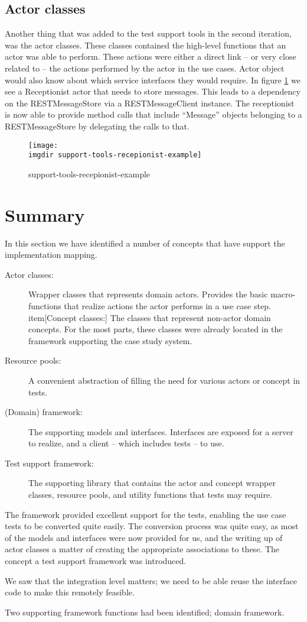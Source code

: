 \subsection{Actor classes}
Another thing that was added to the test support tools in the second iteration, was the actor classes. These classes contained the high-level functions that an actor was able to perform. These actions were either a direct link -- or very close related to -- the actions performed by the actor in the use cases. Actor object would also know about which service interfaces they would require. In figure \ref{fig:support-tools-recepionist-example} we see a Receptionist actor that needs to store messages. This leads to a dependency on the RESTMessageStore via a RESTMessageClient instance. The receptionist is now able to provide method calls that include ``Message'' objects belonging to a RESTMessageStore by delegating the calls to that.
\begin{figure}[!htbp]
 \centering
 \texttt{[image: \\imgdir support-tools-recepionist-example]}
 \caption{support-tools-recepionist-example}
 \label{fig:support-tools-recepionist-example}
\end{figure}

\section{Summary}
In this section we have identified a number of concepts that have support the implementation mapping.
\begin{description}
  \item[Actor classes:] Wrapper classes that represents domain actors. Provides the basic macro-functions that realize actions the actor performs in a use case step.
   item[Concept classes:] The classes that represent non-actor domain concepts. For the most parts, these classes were already located in the framework supporting the case study system.
  \item[Resource pools:] A convenient abstraction of filling the need for various actors or concept in tests.
  \item[(Domain) framework:] The supporting models and interfaces. Interfaces are exposed for a server to realize, and a client -- which includes tests -- to use.
  \item[Test support framework:] The supporting library that contains the actor and concept wrapper classes, resource pools, and utility functions that tests may require.
\end{description}
The framework provided excellent support for the tests, enabling the use case tests to be converted quite easily. The conversion process was quite easy, as most of the models and interfaces were now provided for us, and the writing up of actor classes a matter of creating the appropriate associations to these.
The concept a test support framework was introduced.

We saw that the integration level matters; we need to be able reuse the interface code to make this remotely feasible.

Two supporting framework functions had been identified; domain framework.
